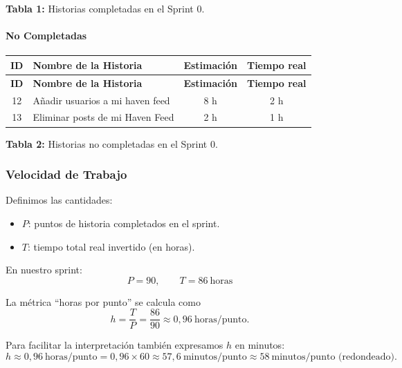 \begin{center}
\small\textbf{Tabla 1:} Historias completadas en el Sprint 0.
\end{center}

\paragraph{No Completadas}
\begin{center}
\renewcommand{\arraystretch}{1.3} %
\begin{longtable}{|c|p{7cm}|c|c|}
\hline
\textbf{ID} & \textbf{Nombre de la Historia} & \textbf{Estimación} & \textbf{Tiempo real} \\
\hline
\endfirsthead

\hline
\textbf{ID} & \textbf{Nombre de la Historia} & \textbf{Estimación} & \textbf{Tiempo real} \\
\hline
\endhead

12  & Añadir usuarios a mi haven feed                     & 8 h  & 2 h \\
\hline
13  & Eliminar posts de mi Haven Feed                         & 2 h  & 1 h  \\
\hline

\end{longtable}
\end{center}

\begin{center}
\small\textbf{Tabla 2:} Historias no completadas en el Sprint 0.
\end{center}

\subsubsection{Velocidad de Trabajo}

Definimos las cantidades:
\begin{itemize}
	\item $P$: puntos de historia completados en el sprint.
	\item $T$: tiempo total real invertido (en horas).
\end{itemize}

En nuestro sprint:
\[
	P = 90,\qquad T = 86\ \text{horas}
\]

La métrica ``horas por punto'' se calcula como
\[
	h = \frac{T}{P} = \frac{86}{90} \approx 0{,}96\ \text{horas/punto}.
\]

Para facilitar la interpretación también expresamos $h$ en minutos:
\[
	h \approx 0{,}96\ \text{horas/punto} = 0{,}96\times60 \approx 57{,}6\ \text{minutos/punto} \approx 58\ \text{minutos/punto (redondeado)}.
\]

